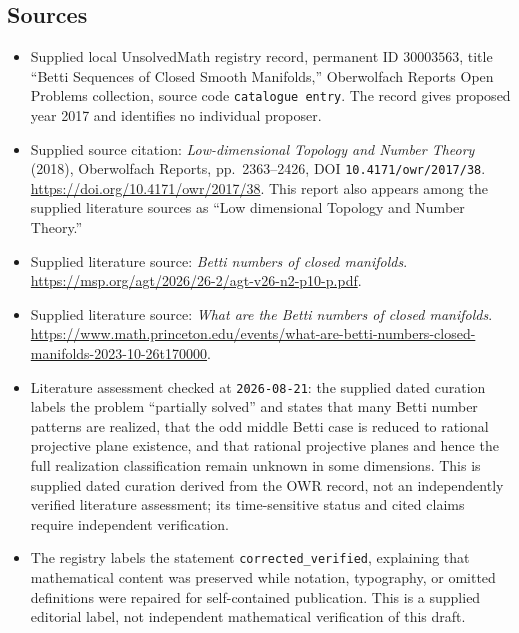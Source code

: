 \documentclass[11pt]{article}
\begin{document}
\subsection{Sources}
\begin{itemize}
\item Supplied local UnsolvedMath registry record, permanent ID \(30003563\), title ``Betti Sequences of Closed Smooth Manifolds,'' Oberwolfach Reports Open Problems collection, source code \texttt{catalogue entry}. The record gives proposed year 2017 and identifies no individual proposer.
\item Supplied source citation: \emph{Low-dimensional Topology and Number Theory} (2018), Oberwolfach Reports, pp.\ 2363--2426, DOI \texttt{10.4171/owr/2017/38}. \url{https://doi.org/10.4171/owr/2017/38}. This report also appears among the supplied literature sources as ``Low dimensional Topology and Number Theory.''
\item Supplied literature source: \emph{Betti numbers of closed manifolds}. \url{https://msp.org/agt/2026/26-2/agt-v26-n2-p10-p.pdf}.
\item Supplied literature source: \emph{What are the Betti numbers of closed manifolds}. \url{https://www.math.princeton.edu/events/what-are-betti-numbers-closed-manifolds-2023-10-26t170000}.
\item Literature assessment checked at \texttt{2026-08-21}: the supplied dated curation labels the problem ``partially solved'' and states that many Betti number patterns are realized, that the odd middle Betti case is reduced to rational projective plane existence, and that rational projective planes and hence the full realization classification remain unknown in some dimensions. This is supplied dated curation derived from the OWR record, not an independently verified literature assessment; its time-sensitive status and cited claims require independent verification.
\item The registry labels the statement \texttt{corrected\_verified}, explaining that mathematical content was preserved while notation, typography, or omitted definitions were repaired for self-contained publication. This is a supplied editorial label, not independent mathematical verification of this draft.
\end{itemize}
\end{document}
